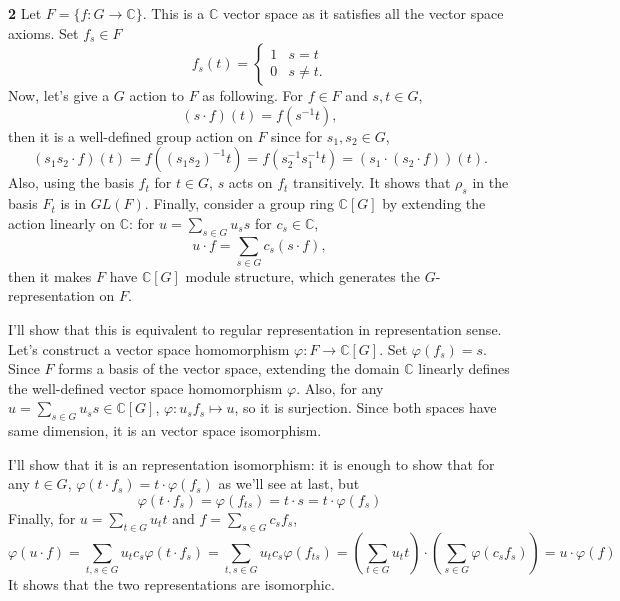 \documentclass[a4paper, 12pt]{article}
\theoremstyle{Mydefinition}
\theoremstyle{Mytheorem}
\begin{document}
\noindent \textbf{2}
Let $F = \{f:G\rightarrow \mathbb{C}\}$. This is a $\mathbb{C}$ vector space as it satisfies all the vector space axioms. Set $f_s\in F$
\begin{equation}
    f_s(t) = \begin{cases}
    1 & s=t\\
    0 & s\neq t.
    \end{cases}
\end{equation}
Now, let's give a $G$ action to $F$ as following. For $f\in F$ and $s,t\in G$,
\begin{equation}
    (s\cdot f)(t) = f(s^{-1}t),
\end{equation}
then it is a well-defined group action on $F$ since for $s_1,s_2\in G$,
\begin{equation}
    (s_1s_2\cdot f)(t) = f((s_1s_2)^{-1}t) =f(s_2^{-1}s_1^{-1}t)= (s_1\cdot (s_2\cdot f))(t).
\end{equation}
Also, using the basis $f_t$ for $t\in G$, $s$ acts on $f_t$ transitively. It shows that $\rho_s$ in the basis $F_t$ is in $GL(F)$. Finally, consider a group ring $\mathbb{C}[G]$ by extending the action linearly on $\mathbb{C}$: for $u=\sum_{s\in G}u_s s$ for $c_s\in\mathbb{C}$,
\begin{equation}
    u\cdot f = \sum_{s\in G}c_s (s\cdot f),
\end{equation}
then it makes $F$ have $\mathbb{C}[G]$ module structure, which generates the $G$-representation on $F$.

I'll show that this is equivalent to regular representation in representation sense. Let's construct a vector space homomorphism $\varphi:F\rightarrow \mathbb{C}[G]$. Set $\varphi(f_s) = s$. Since $F$ forms a basis of the vector space, extending the domain $\mathbb{C}$ linearly defines the well-defined vector space homomorphism $\varphi$. Also, for any $u = \sum_{s\in G}u_s s\in \mathbb{C}[G]$, $\varphi:u_sf_s\mapsto u$, so it is surjection. Since both spaces have same dimension, it is an vector space isomorphism.

I'll show that it is an representation isomorphism: it is enough to show that for any $t\in G$, $\varphi(t\cdot f_s) = t\cdot \varphi(f_s)$ as we'll see at last, but
\begin{equation}
    \varphi(t\cdot f_s) = \varphi(f_{ts}) = t\cdot s = t\cdot \varphi(f_s)
\end{equation}
Finally, for $u=\sum_{t\in G}u_t t$ and $f = \sum_{s\in G}c_s f_s$,
\begin{equation}
    \varphi(u\cdot f) = \sum_{t,s\in G}u_tc_s\varphi(t\cdot f_s) = \sum_{t,s\in G}u_tc_s\varphi(f_{ts}) = \left(\sum_{t\in G}u_tt\right)\cdot \left(\sum_{s\in G}\varphi(c_s f_s)\right) = u\cdot \varphi(f)
\end{equation}
It shows that the two representations are isomorphic.\\
\end{document}
